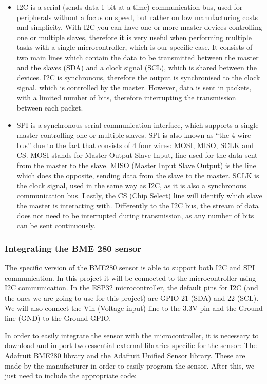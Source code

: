 \documentclass[12pt]{article}
\begin{document}
\begin{itemize}
    \item I2C is a serial (sends data 1 bit at a time) communication bus, used for peripherals without a focus on speed, but rather on low manufacturing costs and simplicity. With I2C you can have one or more master devices controlling one or multiple slaves, therefore it is very useful when performing multiple tasks with a single microcontroller, which is our specific case. It consists of two main lines which contain the data to be transmitted between the master and the slaves (SDA) and a clock signal (SCL), which is shared between the devices. I2C is synchronous, therefore the output is synchronised to the clock signal, which is controlled by the master. However, data is sent in packets, with a limited number of bits, therefore interrupting the transmission between each packet.
    \item SPI is a synchronous serial communication interface, which supports a single master controlling one or multiple slaves. SPI is also known as ``the 4 wire bus'' due to the fact that consists of 4 four wires: MOSI, MISO, SCLK and CS. MOSI stands for Master Output Slave Input, line used for the data sent from the master to the slave. MISO (Master Input Slave Output) is the line which does the opposite, sending data from the slave to the master. SCLK is the clock signal, used in the same way as I2C, as it is also a synchronous communication bus. Lastly, the CS (Chip Select) line will identify which slave the master is interacting with. Differently to the I2C bus, the stream of data does not need to be interrupted during transmission, as any number of bits can be sent continuously.
\end{itemize}

\subsubsection{Integrating the BME 280 sensor}

The specific version of the BME280 sensor is able to support both I2C and SPI communication. In this project it will be connected to the microcontroller using I2C communication. In the ESP32 microcontroller, the default pins for I2C (and the ones we are going to use for this project) are GPIO 21 (SDA) and 22 (SCL). We will also connect the Vin (Voltage input) line to the 3.3V pin and the Ground line (GND) to the Ground GPIO.\par

In order to easily integrate the sensor with the microcontroller, it is necessary to download and import two essential external libraries specific for the sensor: The Adafruit BME280 library and the Adafruit Unified Sensor library. These are made by the manufacturer in order to easily program the sensor. After this, we just need to include the appropriate code:
\end{document}
